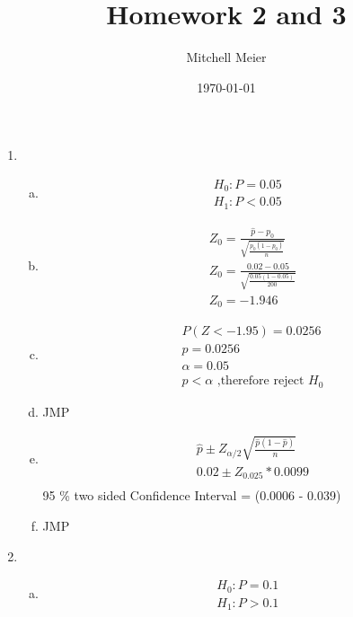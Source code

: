 \documentclass[14pt]{article}
\title{Homework 2 and 3}
\author{Mitchell Meier}
\date{\today}
\begin{document}
\maketitle

\begin{enumerate}

\item

\begin{enumerate}[(a)]
\item

\begin{align*}
H_0: P = 0.05 \\[15pt]
H_1: P < 0.05
\end{align*}

\item
\begin{align*}
& Z_0 = \frac{\hat{p} - p_0}{\sqrt{\frac{p_0 (1 - p_0)}{n}}} \\[15pt]
& Z_0 = \frac{0.02 - 0.05}{\sqrt{\frac{0.05 (1 - 0.05)}{200}}} \\[15pt]
& Z_0 = -1.946
\end{align*}

\item
\begin{align*}
& P(Z < -1.95) = 0.0256 \\[15pt]
& p = 0.0256 \\[15pt]
& \alpha = 0.05 \\[15pt]
& p < \alpha \text{ ,therefore reject } H_0
\end{align*}

\item
JMP

\item
\begin{align*}
& \hat{p} \pm Z_{\alpha / 2} \sqrt{\frac{\hat{p}(1-\hat{p})}{n}} \\[15pt]
& 0.02 \pm Z_{0.025} * 0.0099 \\[15pt]
\end{align*}
95 \% two sided Confidence Interval = (0.0006 - 0.039)

\item
JMP
\end{enumerate}

\item
\begin{enumerate}[(a)]
\item
\begin{align*}
H_0: P = 0.1 \\[15pt]
H_1: P > 0.1
\end{align*}


\end{enumerate}
\end{enumerate}
\end{document}
